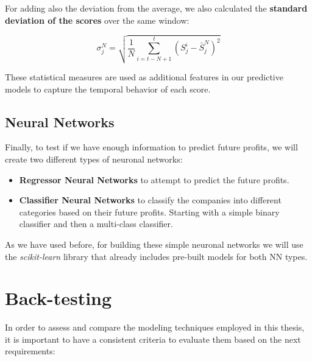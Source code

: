 \documentclass[11pt,english,a4paper,hidelinks]{book}
\begin{document}
\noindent For adding also the deviation from the average, we also calculated the \textbf{standard deviation of the scores} over the same window:

\begin{equation}
    \sigma_j^N = \sqrt{\frac{1}{N} \sum_{i=t-N+1}^{t} (S_j^i - \bar{S}_j^N)^2}
\end{equation}

\noindent These statistical measures are used as additional features in our predictive models to capture the temporal behavior of each score.

\subsection{Neural Networks}

Finally, to test if we have enough information to predict future profits, we will create two different types of neuronal networks:
\begin{itemize}
    \item \textbf{Regressor Neural Networks} to attempt to predict the future profits.
    \item \textbf{Classifier Neural Networks} to classify the companies into different categories based on their future profits. Starting with a simple binary classifier and then a multi-class classifier.
\end{itemize}

As we have used before, for building these simple neuronal networks we will use the \textit{scikit-learn} library that already includes pre-built models for both NN types.
\section{Back-testing}

In order to assess and compare the modeling techniques employed in this thesis, it is important to have a consistent criteria to evaluate them based on the next requirements:
\end{document}

